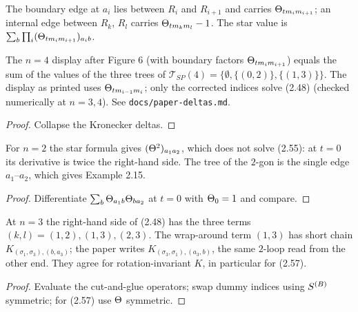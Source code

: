 \begin{definition}[Tree values: star graph and $n=4$, Definition 3.3]\label{def:3.3}
  \leanok{}
  The boundary edge at $a_i$ lies between $R_i$ and $R_{i+1}$ and carries
  $\Theta_{t m_i m_{i+1}}$; an internal edge between $R_k$, $R_l$ carries $\Theta_{tm_km_l}-1$.
  The star value is $\sum_b\prod_i(\Theta_{tm_im_{i+1}})_{a_ib}$.
\end{definition}

\begin{lemma}[$n=4$ display and the three trees]\label{lem:tree-four}
  \leanok{}
  The $n=4$ display after Figure 6 (with boundary factors $\Theta_{tm_im_{i+1}}$) equals the sum
  of the values of the three trees of $\mathcal T_{SP}(4)=\{\emptyset,\{(0,2)\},\{(1,3)\}\}$.
  The display as printed uses $\Theta_{tm_{i-1}m_i}$; only the corrected indices solve (2.48)
  (checked numerically at $n=3,4$).  See \texttt{docs/paper-deltas.md}.
\end{lemma}
\begin{proof}\leanok{}
  Collapse the Kronecker deltas.
\end{proof}

\begin{lemma}[The case $n=2$]\label{lem:tree-two}
  \leanok
  For $n=2$ the star formula gives $(\Theta^2)_{a_1a_2}$, which does not solve (2.55): at $t=0$
  its derivative is twice the right-hand side.  The tree of the $2$-gon is the single edge
  $a_1$--$a_2$, which gives Example 2.15.
\end{lemma}
\begin{proof}\leanok{}
  Differentiate $\sum_b\Theta_{a_1b}\Theta_{ba_2}$ at $t=0$ with $\Theta_0=1$ and compare.
\end{proof}

\begin{lemma}[Index check at $n=3$, Example 2.16]\label{eq:2.16-index}
  \leanok
  At $n=3$ the right-hand side of (2.48) has the three terms $(k,l)=(1,2),(1,3),(2,3)$.
  The wrap-around term $(1,3)$ has short chain $K_{(\sigma_1,\sigma_3),(b,a_3)}$; the paper
  writes $K_{(\sigma_3,\sigma_1),(a_3,b)}$, the same $2$-loop read from the other end.  They
  agree for rotation-invariant $K$, in particular for (2.57).
\end{lemma}
\begin{proof}\leanok{}
  Evaluate the cut-and-glue operators; swap dummy indices using $S^{(B)}$ symmetric; for (2.57)
  use $\Theta$ symmetric.
\end{proof}

